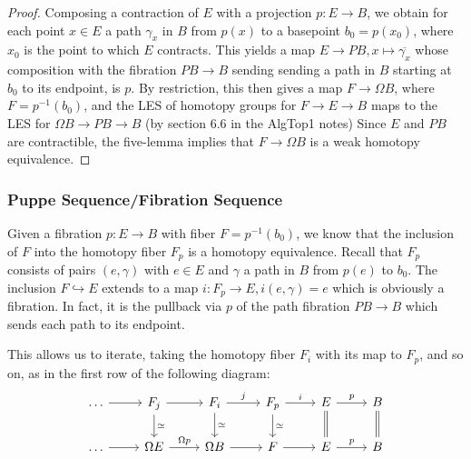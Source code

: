 \documentclass[reqno]{amsart}
\theoremstyle{definition}
\theoremstyle{remark}
\begin{document}
     \begin{proof}
         Composing a contraction of $E$ with a projection
         $p \colon E \to B$, we obtain for each
         point $x \in E$ a path
         $\gamma_x$ in $B$ from $p(x)$ to a basepoint
         $b_0 = p(x_0)$, where $x_0$ is the point to which
         $E$ contracts.
         This yields a map $E \to PB, x\mapsto \overline{\gamma_x}$ 
         whose composition with the fibration
         $PB \to B$ sending
         sending a path in $B$ starting at $b_0$ to
         its endpoint, is $p$.
         By restriction, this then gives
         a map $F \to \Omega B$, where
         $F = p^{-1}(b_0)$, and the LES of
         homotopy groups for $F \to E \to B$ maps
         to the LES for 
         $\Omega B \to PB \to B$ (by section 6.6 in the 
         AlgTop1 notes)
         Since $E$ and $PB$ are contractible, the five-lemma
         implies that $F \to \Omega B$ is a weak homotopy
         equivalence.
     \end{proof}

     \subsubsection{Puppe Sequence/Fibration Sequence}

     Given a fibration $p \colon E \to B$ with
     fiber $F = p^{-1}(b_0)$, we know that the
     inclusion of $F$ into the homotopy fiber
     $F_p$ is a homotopy equivalence. Recall
     that $F_p $ consists of pairs
     $(e, \gamma)$ with $e \in E$ and
     $\gamma$ a path in $B$ from $p(e)$ to $b_0$.
     The inclusion $F \hookrightarrow E$ extends
     to a map $i \colon F_p \to E,
     i(e, \gamma) = e$ which is obviously a fibration.
     In fact, it is the pullback via $p$ of the path
     fibration $PB \to B$ which sends each
     path to its endpoint.

     This allows us to iterate, taking
     the homotopy fiber $F_i$ with its map to
     $F_p$, and so on, as in the first row of the
     following diagram:
     \begin{equation*}
     \begin{tikzcd}
         \ldots \ar[r] & F_j \ar[r] \ar[d, "\simeq"] &
         F_i \ar[r, "j"] \ar[d, "\simeq"] &
         F_p \ar[r, "i"] \ar[d, "\simeq"] & E \ar[r, "p"] 
         \ar[d, equal] &
B \ar[d, equal] \\
             \ldots \ar[r] & \Omega E \ar[r, "\Omega p"] &
         \Omega B \ar[r] & F \ar[r] & E \ar[r, "p"] & B
     \end{tikzcd}
     \end{equation*}
\end{document}
